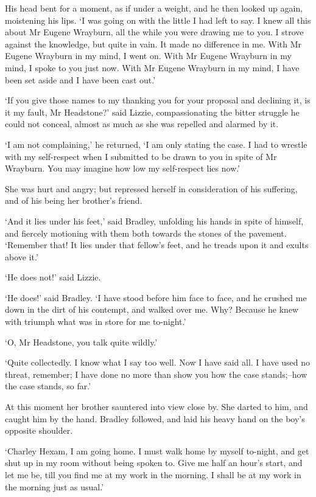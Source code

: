 His head bent for a moment, as if under a weight, and he then looked up
again, moistening his lips. ‘I was going on with the little I had left
to say. I knew all this about Mr Eugene Wrayburn, all the while you were
drawing me to you. I strove against the knowledge, but quite in vain. It
made no difference in me. With Mr Eugene Wrayburn in my mind, I went
on. With Mr Eugene Wrayburn in my mind, I spoke to you just now. With Mr
Eugene Wrayburn in my mind, I have been set aside and I have been cast
out.’

‘If you give those names to my thanking you for your proposal
and declining it, is it my fault, Mr Headstone?’ said Lizzie,
compassionating the bitter struggle he could not conceal, almost as much
as she was repelled and alarmed by it.

‘I am not complaining,’ he returned, ‘I am only stating the case. I had
to wrestle with my self-respect when I submitted to be drawn to you in
spite of Mr Wrayburn. You may imagine how low my self-respect lies now.’

She was hurt and angry; but repressed herself in consideration of his
suffering, and of his being her brother’s friend.

‘And it lies under his feet,’ said Bradley, unfolding his hands in spite
of himself, and fiercely motioning with them both towards the stones of
the pavement. ‘Remember that! It lies under that fellow’s feet, and he
treads upon it and exults above it.’

‘He does not!’ said Lizzie.

‘He does!’ said Bradley. ‘I have stood before him face to face, and he
crushed me down in the dirt of his contempt, and walked over me. Why?
Because he knew with triumph what was in store for me to-night.’

‘O, Mr Headstone, you talk quite wildly.’

‘Quite collectedly. I know what I say too well. Now I have said all. I
have used no threat, remember; I have done no more than show you how the
case stands;--how the case stands, so far.’

At this moment her brother sauntered into view close by. She darted to
him, and caught him by the hand. Bradley followed, and laid his heavy
hand on the boy’s opposite shoulder.

‘Charley Hexam, I am going home. I must walk home by myself to-night,
and get shut up in my room without being spoken to. Give me half an
hour’s start, and let me be, till you find me at my work in the morning.
I shall be at my work in the morning just as usual.’

